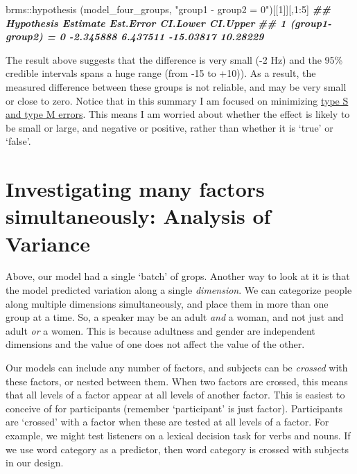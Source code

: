 \documentclass[
]{book}
\newenvironment{Shaded}{\begin{snugshade}}{\end{snugshade}}
\newcommand{\DecValTok}[1]{\textcolor[rgb]{0.00,0.00,0.81}{#1}}
\newcommand{\DocumentationTok}[1]{\textcolor[rgb]{0.56,0.35,0.01}{\textbf{\textit{#1}}}}
\newcommand{\FunctionTok}[1]{\textcolor[rgb]{0.00,0.00,0.00}{#1}}
\newcommand{\NormalTok}[1]{#1}
\newcommand{\SpecialCharTok}[1]{\textcolor[rgb]{0.00,0.00,0.00}{#1}}
\newcommand{\StringTok}[1]{\textcolor[rgb]{0.31,0.60,0.02}{#1}}
\begin{document}
\begin{Shaded}
\begin{Highlighting}[]
\NormalTok{brms}\SpecialCharTok{::}\FunctionTok{hypothesis}\NormalTok{ (model\_four\_groups, }\StringTok{"group1 {-} group2 = 0"}\NormalTok{)[[}\DecValTok{1}\NormalTok{]][,}\DecValTok{1}\SpecialCharTok{:}\DecValTok{5}\NormalTok{]}
\DocumentationTok{\#\#            Hypothesis  Estimate Est.Error  CI.Lower CI.Upper}
\DocumentationTok{\#\# 1 (group1{-}group2) = 0 {-}2.345888  6.437511 {-}15.03817 10.28229}
\end{Highlighting}
\end{Shaded}

The result above suggests that the difference is very small (-2 Hz) and the 95\% credible intervals spans a huge range (from -15 to +10)). As a result, the measured difference between these groups is not reliable, and may be very small or close to zero. Notice that in this summary I am focused on minimizing \href{https://statmodeling.stat.columbia.edu/2004/12/29/type_1_type_2_t/}{type S and type M errors}. This means I am worried about whether the effect is likely to be small or large, and negative or positive, rather than whether it is `true' or `false'.

\hypertarget{investigating-many-factors-simultaneously-analysis-of-variance}{%
\section{Investigating many factors simultaneously: Analysis of Variance}\label{investigating-many-factors-simultaneously-analysis-of-variance}}

Above, our model had a single `batch' of grops. Another way to look at it is that the model predicted variation along a single \emph{dimension}. We can categorize people along multiple dimensions simultaneously, and place them in more than one group at a time. So, a speaker may be an adult \emph{and} a woman, and not just and adult \emph{or} a women. This is because adultness and gender are independent dimensions and the value of one does not affect the value of the other.

Our models can include any number of factors, and subjects can be \emph{crossed} with these factors, or nested between them. When two factors are crossed, this means that all levels of a factor appear at all levels of another factor. This is easiest to conceive of for participants (remember `participant' is just factor). Participants are `crossed' with a factor when these are tested at all levels of a factor. For example, we might test listeners on a lexical decision task for verbs and nouns. If we use word category as a predictor, then word category is crossed with subjects in our design.
\end{document}

